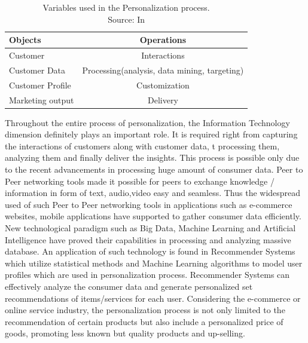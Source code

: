 \begin{table}[t]
\centering
\begin{tabular}{|l|c|}
\hline
Objects & Operations\\
\hline\hline
Customer & Interactions\\
\hline
Customer Data  &  Processing(analysis, data mining, targeting)\\
\hline
Customer Profile  & Customization\\
\hline
Marketing output  & Delivery\\
\hline
\end{tabular}
\centering
\caption{
Variables used in the Personalization process.\\
Source: In \autocite[8]{VesanenRaulas2007}}
\label{tab:template}
\end{table}

Throughout the entire process of personalization, the Information Technology dimension definitely plays an important role. It is required right from capturing the interactions of customers along with customer data, t processing them, analyzing them and finally deliver the insights. This process is possible only due to the recent advancements in processing huge amount of consumer data. Peer to Peer networking tools made it possible for peers to exchange knowledge / information in form of text, audio,video easy and seamless. Thus the widespread used of such Peer to Peer networking tools in applications such as e-commerce websites, mobile applications have supported to gather consumer data efficiently. New technological paradigm such as Big Data, Machine Learning and Artificial Intelligence have proved their capabilities in processing and analyzing massive database. An application of such technology is found in Recommender Systems which utilize statistical methods and Machine Learning algorithms to model user profiles which are used in personalization process\autocite[4]{Adomavicius2011}. Recommender Systems can effectively analyze the consumer data and generate personalized set recommendations of items/services for each user. Considering the e-commerce or online service industry, the personalization process is not only limited to the recommendation of certain products but also include a personalized price of goods, promoting less known but quality products and up-selling. \autocite[203]{zhang2009effectiveness} \\ \par 

